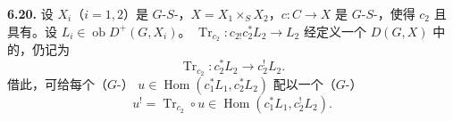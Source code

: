 \textbf{6.20.} 设 $X_i$（$i=1,2$）是 $G$-$S$-，$X=X_1\times_SX_2$，$c:C\to X$ 是 $G$-$S$-，使得 $c_2$ 且具有。设 $L_i\in\operatorname{ob}D^+(G,X_i)$。 $\operatorname{Tr}_{c_2}:c_{2!}c_2^*L_2\to L_2$ 经定义一个 $D(G,X)$ 中的，仍记为
\begin{equation}\operatorname{Tr}_{c_2}:c_2^*L_2\longrightarrow c_2^!L_2.\tag{6.20.1}\end{equation}
借此，可给每个（$G$-） $u\in\operatorname{Hom}(c_1^*L_1,c_2^*L_2)$ 配以一个（$G$-）
\begin{equation}u^!=\operatorname{Tr}_{c_2}\circ u\in\operatorname{Hom}(c_1^*L_1,c_2^!L_2).\tag{6.20.2}\end{equation}

